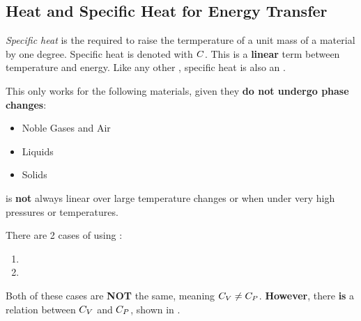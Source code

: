 \subsection{Heat and Specific Heat for Energy Transfer}\label{subsec:Heat_Specific_Heat_Energy_Transfer}
\begin{definition}\label{def:Specific_Heat}
  \emph{Specific heat} is the  required to raise the termperature of a unit mass of a material by one degree.
  Specific heat is denoted with $C$.
  This is a \textbf{linear} term between temperature and energy.
  Like any other , specific heat is also an .

  \begin{remark}
    This  only works for the following materials, given they \textbf{do not undergo phase changes}:
    \begin{itemize}[noitemsep]
    \item Noble Gases and Air
    \item Liquids
    \item Solids
    \end{itemize}
  \end{remark}

  \begin{remark}
     is \textbf{not} always linear over large temperature changes or when under very high pressures or temperatures.
  \end{remark}
\end{definition}

There are 2 cases of using :
\begin{enumerate}[noitemsep]
\item {}
\item {}
\end{enumerate}

Both of these cases are \textbf{NOT} the same, meaning $C_{V} \neq C_{P}$.
{\large\textbf{However}}, there \textbf{is} a relation between $C_{V}$ and $C_{P}$, shown in .


